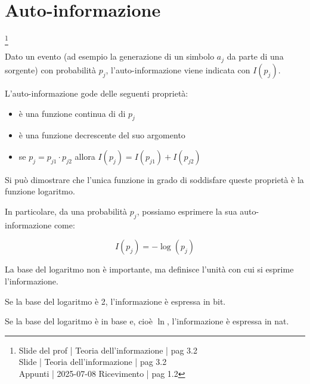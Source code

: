 \newpage 

\section{Auto-informazione}
\footnote{Slide del prof | Teoria dell'informazione | pag 3.2 \\  
Slide | Teoria dell'informazione | pag 3.2 \\
Appunti | 2025-07-08 Ricevimento | pag 1.2 }

Dato un evento (ad esempio la generazione di un simbolo $a_j$ da parte di una sorgente) con probabilità $p_j$, 
l'auto-informazione viene indicata con $I(p_j)$. \newline 

L'auto-informazione gode delle seguenti proprietà: 

\begin{itemize}
    \item è una funzione continua di di $p_j$ 
    \item è una funzione decrescente del suo argomento 
    \item se $p_j = p_{j1} \cdot p_{j2}$ allora $I (p_j) = I (p_{j1}) + I (p_{j2})$
\end{itemize}

Si può dimostrare che l'unica funzione in grado di soddisfare queste proprietà è la funzione logaritmo. \newline 

In particolare, da una probabilità $p_j$, possiamo esprimere la sua auto-informazione come: 

{
    \Large 
    \begin{equation}
        I (p_j) = - \log(p_j)
    \end{equation}
}

La base del logaritmo non è importante, ma definisce l'unità con cui si esprime l'informazione. \newline 

Se la base del logaritmo è 2, l'informazione è espressa in bit. \newline 

Se la base del logaritmo è in base e, cioè $\ln$, l'informazione è espressa in nat. \newline 

